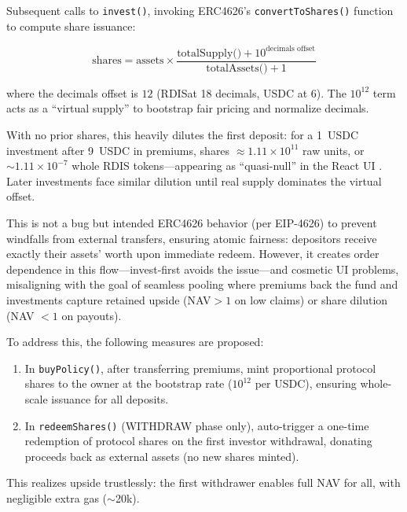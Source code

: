 \documentclass[11pt,a4paper]{article}
\begin{document}
        Subsequent calls to \texttt{invest()}, invoking ERC4626's \texttt{convertToShares()} function to compute share issuance:

        \[
        \text{shares} = \text{assets} \times \frac{\text{totalSupply()} + 10^{\text{decimals offset}}}{\text{totalAssets()} + 1}
        \]

        where the decimals offset is $12$ (RDIS\footnotemark at 18 decimals, USDC at 6). 
        The $10^{12}$ term acts as a ``virtual supply'' to bootstrap fair pricing and normalize decimals.

        With no prior shares, this heavily dilutes the first deposit: for a 1~USDC investment after 9~USDC in premiums, shares $\approx 1.11 \times 10^{11}$ raw units, or $\sim 1.11 \times 10^{-7}$ whole RDIS tokens---appearing as ``quasi-null'' in the React UI .
        Later investments face similar dilution until real supply dominates the virtual offset.

        This is not a bug but intended ERC4626 behavior (per EIP-4626\footnotemark) to prevent windfalls from external transfers, ensuring atomic fairness: depositors receive exactly their assets' worth upon immediate redeem. 
        However, it creates order dependence in this flow---invest-first avoids the issue---and cosmetic UI problems, misaligning with the goal of seamless pooling where premiums back the fund and investments capture retained upside (NAV\footnotemark $> 1$ on low claims) or share dilution (NAV $< 1$ on payouts). 

        To address this, the following measures are proposed:
        \begin{enumerate}
        \item In \texttt{buyPolicy()}, after transferring premiums, mint proportional protocol shares to the owner at the bootstrap rate ($10^{12}$ per USDC), ensuring whole-scale issuance for all deposits.
        \item In \texttt{redeemShares()} (WITHDRAW phase only), auto-trigger a one-time redemption of protocol shares on the first investor withdrawal, donating proceeds back as external assets (no new shares minted).
        \end{enumerate}
        This realizes upside trustlessly: the first withdrawer enables full NAV for all, with negligible extra gas ($\sim$20k).
\end{document}
